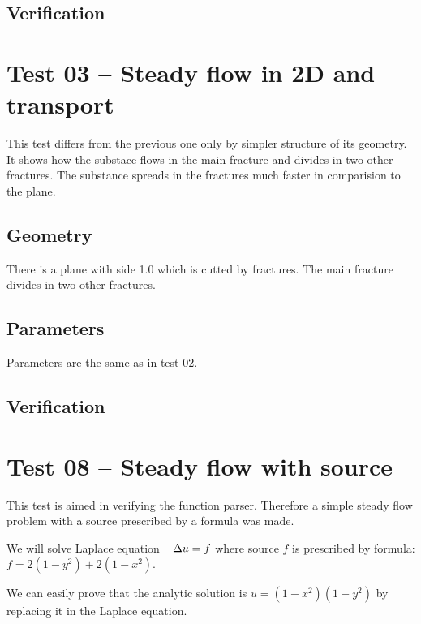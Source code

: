 \subsection*{Verification}




\section{Test 03 -- Steady flow in 2D and transport}
This test differs from the previous one only by simpler structure of its geometry. It shows how the substace flows in the main fracture and divides in two other fractures. The substance spreads in the fractures much faster in comparision to the plane.
\subsection*{Geometry}
There is a plane with side 1.0 which is cutted by fractures. The main fracture divides in two other fractures.
\subsection*{Parameters}
Parameters are the same as in test 02.
\subsection*{Verification}



\section{Test 08 -- Steady flow with source}
This test is aimed in verifying the function parser. Therefore a simple steady flow problem with a source prescribed by a formula was made.

We will solve Laplace equation $-\Delta{}u = f$ where source $f$ is prescribed by formula: $f = 2(1-y^2) + 2(1-x^2)$.

We can easily prove that the analytic solution is $u = (1-x^2)(1-y^2)$ by replacing it in the Laplace equation.

